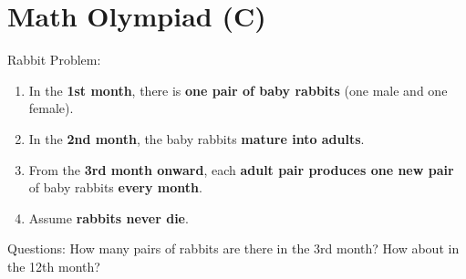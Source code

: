 \documentclass[a4paper,12pt]{article}
\begin{document}
\section*{\huge \center\textbf{Math Olympiad (C)}}
\vspace{1 cm}
\LARGE{Rabbit Problem}:\\
\begin{enumerate}
\large
\item In the \textbf{1st month}, there is \textbf{one pair of baby rabbits} (one male and one female). \\
\item In the \textbf{2nd month}, the baby rabbits \textbf{mature into adults}. \\
\item From the \textbf{3rd month onward}, each \textbf{adult pair produces one new pair} of baby rabbits \textbf{every month}. \\
\item Assume \textbf{rabbits never die}. \\
\end{enumerate}
\large
Questions: How many pairs of rabbits are there in the 3rd month? How about in the 12th month?
\end{document}
